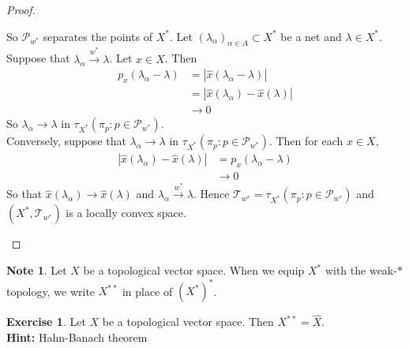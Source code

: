 \documentclass[12pt]{amsart}
\theoremstyle{definition}
\newtheorem{note}[definition]{Note}
\newtheorem{ex}[definition]{Exercise}
\newcommand{\al}{\alpha}
\newcommand{\lam}{\lambda}
\newcommand{\MP}{\mathcal{P}}
\newcommand{\MT}{\mathcal{T}}
\newcommand{\tbf}[1]{\textbf{#1}}
\newcommand{\conv}[1]{\xrightarrow{#1}}
\DeclareMathOperator*{\0}{\mbf{0}}
\DeclareMathOperator*{\1}{\mbf{1}}
\newcommand{\lex}[1]{\label{ex:#1}}
\begin{document}
\begin{proof}
\begin{enumerate}
			So $\MP_{w^*}$ separates the points of $X^*$. Let $(\lam_{\al})_{\al \in A} \subset X^*$ be a net and $\lam \in X^*$. Suppose that $\lam_{\al} \conv{w^*} \lam$. Let $x \in X$. Then 
			\begin{align*}
				p_x(\lam_{\al} - \lam) 
				&= |\hat{x}(\lam_{\al} - \lam)| \\
				&= |\hat{x}(\lam_{\al}) - \hat{x}(\lam)| \\
				& \rightarrow 0
			\end{align*}
			So $\lam_{\al} \rightarrow \lam$ in $\tau_{X^*}(\pi_p: p \in \MP_{w^*})$. \\
			Conversely, suppose that $\lam_{\al} \rightarrow \lam $ in $\tau_{X^*}(\pi_p: p \in \MP_{w^*})$. Then for each $x \in X$,
			\begin{align*}
				|\hat{x}(\lam_{\al}) - \hat{x}(\lam)|
				&= p_x(\lam_{\al} - \lam) \\
				& \rightarrow 0
			\end{align*}
			So that $\hat{x}(\lam_{\al}) \rightarrow \hat{x}(\lam)$ and $\lam_{\al} \conv{w^*} \lam$. Hence $\MT_{w^*} = \tau_{X^*}(\pi_p: p \in \MP_{w^*})$ and $(X^*, \MT_{w^*})$ is a locally convex space.  
		\end{enumerate}
	\end{proof}

	\begin{note}
		Let $X$ be a topological vector space. When we equip $X^*$ with the weak-$*$ topology, we write $X^{**}$ in place of $(X^*)^*$.
	\end{note}
	
	
	\begin{ex} \lex{}
		Let $X$ be a topological vector space. Then $X^{**} = \hat{X}$. \\
		\tbf{Hint:} Hahn-Banach theorem
	\end{ex}
	
\end{document}
